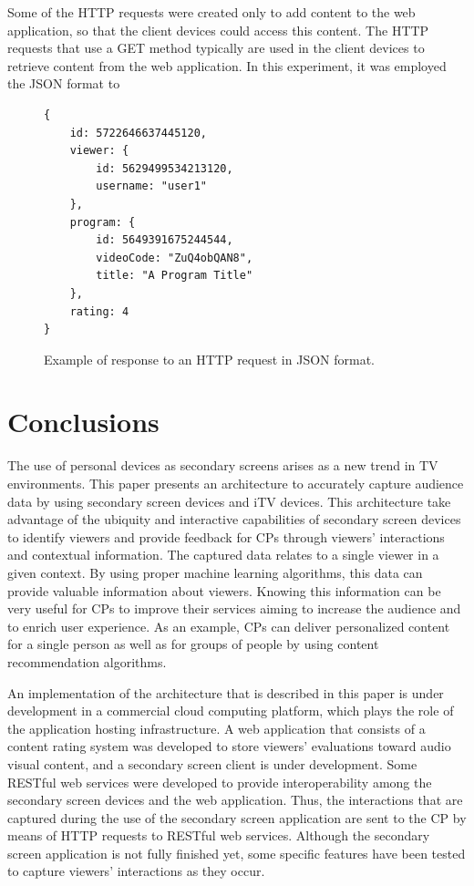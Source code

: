 \documentclass[journal]{IEEEtran}
\begin{document}
Some of the HTTP requests were created only to add content to the web application, so that the client devices could access this content. The HTTP requests that use a GET method typically are used in the client devices to retrieve content from the web application. In this experiment, it was employed the JSON format to 

\begin{figure}
\begin{verbatim}
{
    id: 5722646637445120,
    viewer: {
        id: 5629499534213120,
        username: "user1"
    },
    program: {
        id: 5649391675244544,
        videoCode: "ZuQ4obQAN8",
        title: "A Program Title"
    },
    rating: 4
}
\end{verbatim}
\caption{Example of response to an HTTP request in JSON format.}
\label{fig_response_json}
\end{figure}

\section{Conclusions}

The use of personal devices as secondary screens arises as a new trend in TV environments. This paper presents an architecture to accurately capture audience data by using secondary screen devices and iTV devices. This architecture take advantage of the ubiquity and interactive capabilities of secondary screen devices to identify viewers and provide feedback for CPs through viewers' interactions and contextual information. The captured data relates to a single viewer in a given context. By using proper machine learning algorithms, this data can provide valuable information about viewers. Knowing this information can be very useful for CPs to improve their services aiming to increase the audience and to enrich user experience. As an example, CPs can deliver personalized content for a single person as well as for groups of people by using content recommendation algorithms.

An implementation of the architecture that is described in this paper is under development in a commercial cloud computing platform, which plays the role of the application hosting infrastructure. A web application that consists of a content rating system was developed to store  viewers' evaluations toward audio visual content, and a secondary screen client is under development. Some RESTful web services were developed to provide interoperability among the secondary screen devices and the web application. Thus, the interactions that are captured during the use of the secondary screen application are sent to the CP by means of HTTP requests to RESTful web services. Although the secondary screen application is not fully finished yet, some specific features have been tested to capture viewers' interactions as they occur.
\end{document}
